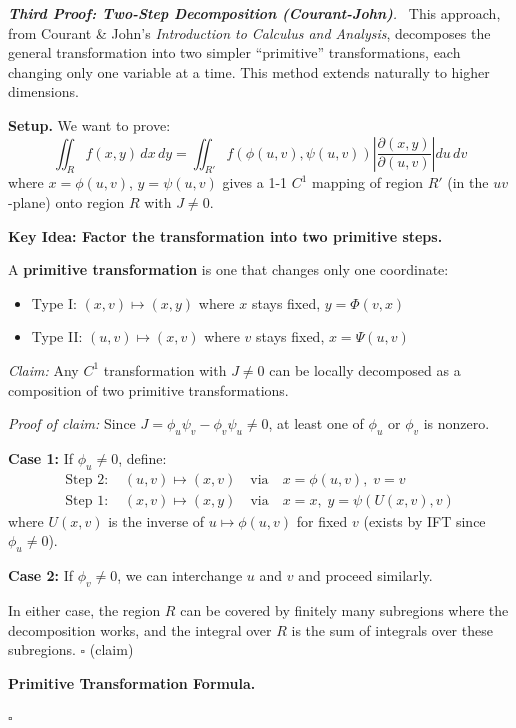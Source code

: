 \documentclass[11pt]{report}
\renewenvironment{proof}[1][Proof]{\par\noindent\textit{#1.}\ }{\hfill$\square$\par\medskip}
\begin{document}
\begin{proof}[\textbf{Third Proof: Two-Step Decomposition (Courant-John)}]
This approach, from Courant \& John's \textit{Introduction to Calculus and Analysis}, decomposes the general transformation into two simpler ``primitive'' transformations, each changing only one variable at a time. This method extends naturally to higher dimensions.

\textbf{Setup.} We want to prove:
\[
\iint_R f(x, y) \, dx \, dy = \iint_{R'} f(\phi(u, v), \psi(u, v)) \left| \frac{\partial(x, y)}{\partial(u, v)} \right| du \, dv
\]
where $x = \phi(u, v)$, $y = \psi(u, v)$ gives a 1-1 $C^1$ mapping of region $R'$ (in the $uv$-plane) onto region $R$ with $J \neq 0$.

\textbf{Key Idea: Factor the transformation into two primitive steps.}

A \textbf{primitive transformation} is one that changes only one coordinate:
\begin{itemize}
    \item Type I: $(x, v) \mapsto (x, y)$ where $x$ stays fixed, $y = \Phi(v, x)$
    \item Type II: $(u, v) \mapsto (x, v)$ where $v$ stays fixed, $x = \Psi(u, v)$
\end{itemize}

\textit{Claim:} Any $C^1$ transformation with $J \neq 0$ can be locally decomposed as a composition of two primitive transformations.

\textit{Proof of claim:} Since $J = \phi_u \psi_v - \phi_v \psi_u \neq 0$, at least one of $\phi_u$ or $\phi_v$ is nonzero. 

\textbf{Case 1:} If $\phi_u \neq 0$, define:
\begin{align*}
\text{Step 2: } & (u, v) \mapsto (x, v) \quad \text{via} \quad x = \phi(u, v), \; v = v \\
\text{Step 1: } & (x, v) \mapsto (x, y) \quad \text{via} \quad x = x, \; y = \psi(U(x, v), v)
\end{align*}
where $U(x, v)$ is the inverse of $u \mapsto \phi(u, v)$ for fixed $v$ (exists by IFT since $\phi_u \neq 0$).

\textbf{Case 2:} If $\phi_v \neq 0$, we can interchange $u$ and $v$ and proceed similarly.

In either case, the region $R$ can be covered by finitely many subregions where the decomposition works, and the integral over $R$ is the sum of integrals over these subregions. \hfill $\square$ (claim)

\textbf{Primitive Transformation Formula.}


\end{proof}
\end{document}
